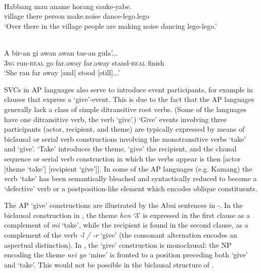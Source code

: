 \ea%
\label{ex:1:26}
\\
\gll Habbang  mau  aname  horang  sauke-yabe. \\
village  there  person  make.noise  dance-lego.lego   \\
\glt `Over there in the village people are making noise dancing lego-lego.'
\z
 


\ea%
\label{ex:1:27}
 \\
\gll A   bir-an  gi  awan  awan  tas-an  gula'... \\
 3\textsc{sg}  run-\textsc{real}   go  far.away  far.away  stand-\textsc{real}  finish  \\
\glt `She ran far away [and] stood [still]...'  
\z
 

SVCs in AP languages also serve to introduce event participants, for example in clauses that express a `give'-event. This is due to the fact that the AP languages generally lack a class of simple ditransitive root verbs. (Some of the languages have one ditransitive verb, the verb `give'.) `Give' events involving three participants (actor, recipient, and theme) are typically expressed by means of biclausal or serial verb constructions involving the monotransitive verbs `take' and `give'. `Take' introduces the theme, `give' the recipient, and the clausal sequence or serial verb construction in which the verbs appear is then [actor [theme `take'] [recipient `give']]. In some of the AP languages (e.g. Kamang) the verb `take' has been semantically bleached and syntactically reduced to become a ‘defective’ verb  or a postposition-like element which encodes oblique constituents.

The AP `give' constructions are illustrated by the Abui sentences in -. In the biclausal construction in , the theme \textit{hen} `3' is expressed in the first clause as a complement of \textit{mi} `take', while the recipient is found in the second clause, as a complement of the verb \textit{{}-l / -r} `give' (the consonant alternation encodes an aspectual distinction). In , the `give' construction is monoclausal: the NP encoding the theme \textit{nei yo} `mine' is fronted to a position preceding both `give' and `take'. This would not be possible in the biclausal structure of .




